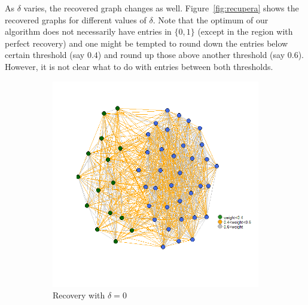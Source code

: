\documentclass[12pt]{amsart}
\theoremstyle{remark}
\begin{document}
As $\delta$ varies, the recovered graph changes as well. Figure~\ref{fig:recupera} shows the recovered graphs for different values of $\delta$. Note that the optimum of our algorithm does not necessarily have entries in $\{0,1\}$ (except in the region with perfect recovery) and one might be tempted to round down the entries below certain threshold (say $0.4$) and round up those above another threshold (say $0.6$). However, it is not clear what to do with entries between both thresholds. 

\begin{figure}[H]
     \centering
     \begin{subfigure}[b]{0.35\textwidth}
         \centering
         \includegraphics[width=\textwidth]{./Pictures/recupera0.png}
         \caption{Recovery with $\delta=0$}
     \end{subfigure}
     \hfill
     \begin{subfigure}[b]{0.37\textwidth}
         \centering

\end{subfigure}
\end{figure}
\end{document}
